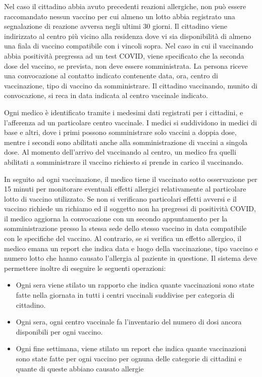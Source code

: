 \documentclass[11pt]{article}
\begin{document}
Nel caso il cittadino abbia avuto precedenti reazioni allergiche, non può essere raccomandato nessun vaccino per cui almeno un lotto abbia registrato una segnalazione di reazione avversa negli ultimi 30 giorni.
Il cittadino viene indirizzato al centro più vicino alla residenza dove vi sia disponibilità di almeno una fiala di vaccino compatibile con i vincoli sopra.
Nel caso in cui il vaccinando abbia positività pregressa ad un test COVID, viene specificato che la seconda dose del vaccino, se prevista, non deve essere somministrata.
La persona riceve una convocazione al contatto indicato contenente data, ora, centro di vaccinazione, tipo di vaccino da somministrare.
Il cittadino vaccinando, munito di convocazione, si reca in data indicata al centro vaccinale indicato.

Ogni medico è identificato tramite i medesimi dati registrati per i cittadini, e l’afferenza ad un particolare centro vaccinale.
I medici si suddividono in medici di base e altri, dove i primi possono somministrare solo vaccini a doppia dose, mentre i secondi sono abilitati anche alla somministrazione di vaccini a singola dose.
Al momento dell’arrivo del vaccinando al centro, un medico fra quelli abilitati a somministrare il vaccino richiesto si prende in carico il vaccinando.

In seguito ad ogni vaccinazione, il medico tiene il vaccinato sotto osservazione per 15 minuti per monitorare eventuali effetti allergici relativamente al particolare lotto di vaccino utilizzato.
Se non si verificano particolari effetti avversi e il vaccino richiede un richiamo ed il soggetto non ha pregressi di positività COVID, il medico aggiorna la convocazione con un secondo appuntamento per la somministrazione presso la stessa sede dello stesso vaccino in data compatibile con le specifiche del vaccino.
Al contrario, se si verifica un effetto allergico, il medico emana un report che indica data e luogo della vaccinazione, tipo vaccino e numero lotto che hanno causato l’allergia al paziente in questione.
Il sistema deve permettere inoltre di eseguire le seguenti operazioni:
\begin{itemize}
\item Ogni sera viene stilato un rapporto che indica quante vaccinazioni sono state fatte nella giornata in tutti i centri vaccinali suddivise per categoria di cittadino.
\item Ogni sera, ogni centro vaccinale fa l’inventario del numero di dosi ancora disponibili per ogni vaccino.
\item Ogni fine settimana, viene stilato un report che indica quante vaccinazioni sono state fatte per ogni vaccino per ognuna delle categorie di cittadini e
quante di queste abbiano causato allergie
\end{itemize}
\end{document}
